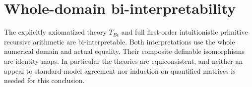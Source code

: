 \section{Whole-domain bi-interpretability}
\label{sec:internal-biinterpretability}

\begin{theorem}
\label{thm:internal-biinterpretability}
The explicitly axiomatized theory $T_{B\epsilon}$ and full first-order
intuitionistic primitive recursive arithmetic are bi-interpretable.
Both interpretations use the whole numerical domain and actual
equality.  Their composite definable isomorphisms are identity maps.
In particular the theories are equiconsistent, and neither an appeal
to standard-model agreement nor induction on quantified matrices is
needed for this conclusion.
\end{theorem}

